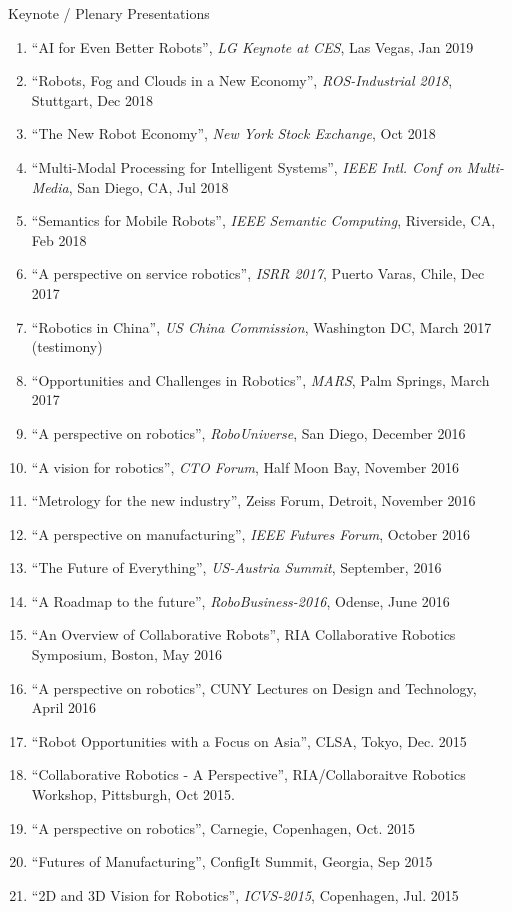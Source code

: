 \documentclass{article}
\begin{document}
\begin{cv}
\begin{cvlist}{Keynote / Plenary Presentations}
\begin{enumerate}
  \item ``AI for Even Better Robots'', {\em LG Keynote at CES}, Las Vegas, Jan 2019
  \item ``Robots, Fog and Clouds in a New Economy'', {\em ROS-Industrial 2018}, Stuttgart, Dec 2018
  \item ``The New Robot Economy'', {\em New York Stock Exchange}, Oct 2018
  \item ``Multi-Modal Processing for Intelligent Systems'', {\em IEEE Intl. Conf on Multi-Media}, San Diego, CA, Jul 2018
  \item ``Semantics for Mobile Robots'', {\em IEEE Semantic Computing}, Riverside, CA, Feb 2018
  \item ``A perspective on service robotics'', {\em ISRR 2017}, Puerto Varas, Chile, Dec 2017
  \item ``Robotics in China'', {\em US China Commission}, Washington DC, March 2017 (testimony)
  \item ``Opportunities and Challenges in Robotics'', {\em MARS}, Palm Springs, March 2017
  \item ``A perspective on robotics'', {\em RoboUniverse}, San Diego,  December 2016
  \item ``A vision for robotics'', {\em CTO Forum}, Half Moon Bay, November 2016
  \item ``Metrology for the new industry'', Zeiss Forum, Detroit,  November 2016
  \item ``A perspective on manufacturing'', {\em IEEE Futures Forum},  October 2016
  \item ``The Future of Everything'', {\em US-Austria Summit},  September, 2016
  \item ``A Roadmap to the future'', {\em RoboBusiness-2016}, Odense,  June 2016
  \item ``An Overview of Collaborative Robots'', RIA Collaborative Robotics Symposium, Boston, May 2016
  \item ``A perspective on robotics'', CUNY Lectures on Design and Technology, April 2016
  \item ``Robot Opportunities with a Focus on Asia'', CLSA, Tokyo,  Dec. 2015
  \item ``Collaborative Robotics - A Perspective'', RIA/Collaboraitve Robotics Workshop, Pittsburgh, Oct 2015.
  \item ``A perspective on robotics'', Carnegie, Copenhagen, Oct. 2015
  \item ``Futures of Manufacturing'', ConfigIt Summit, Georgia, Sep 2015
  \item ``2D and 3D Vision for Robotics'', {\em ICVS-2015}, Copenhagen, Jul. 2015

\end{enumerate}
\end{cvlist}
\end{cv}
\end{document}
